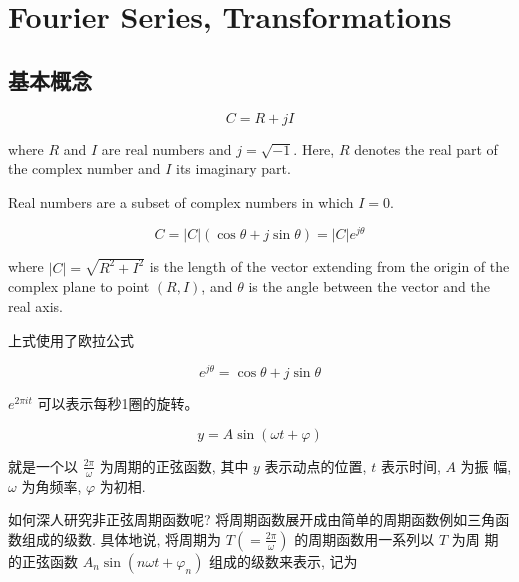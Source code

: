 \chapter{Fourier Series, Transformations}

\section{基本概念}

\begin{definition}
    $$ C=R+j I $$

    where $ R $ and $ I $ are real numbers and $ j=\sqrt{-1} $. Here, $ R $ denotes the real part of the complex number and $ I $ its imaginary part. 
    
    Real numbers are a subset of complex numbers in which $I = 0$.
\end{definition}

\begin{definition}
    $$ C=|C|(\cos \theta+j \sin \theta) = |C| e^{j \theta} $$
    
    where $ |C|=\sqrt{R^{2}+I^{2}} $ is the length of the vector extending from the origin of the complex plane to point $ (R, I) $, and $ \theta $ is the angle between the vector and the real axis.
\end{definition}

上式使用了欧拉公式

\begin{theorem}
    $$ e^{j \theta}=\cos \theta+j \sin \theta $$
\end{theorem}

\begin{corollary}
    $e^{2 \pi it}$ 可以表示每秒1圈的旋转。
\end{corollary}

\begin{definition}[正弦函数]
    $$ y=A \sin (\omega t+\varphi) $$

    就是一个以 $ \frac{2 \pi}{\omega} $ 为周期的正弦函数, 其中 $ y $ 表示动点的位置, $ t $ 表示时间, $ A $ 为振 幅, $ \omega $ 为角频率, $ \varphi $ 为初相.
\end{definition}

如何深人研究非正弦周期函数呢? 将周期函数展开成由简单的周期函数例如三角函数组成的级数. 具体地说, 将周期为 $ T\left(=\frac{2 \pi}{\omega}\right) $ 的周期函数用一系列以 $ T $ 为周 期的正弦函数 $ A_{n} \sin \left(n \omega t+\varphi_{n}\right) $ 组成的级数来表示, 记为

